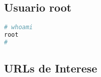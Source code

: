 \documentclass[a4paper]{article}
\begin{document}
\subsection{Usuario root}
        \begin{lstlisting}[language=Bash, caption=Usuario root]
# whoami
root
#\end{lstlisting}
        
\clearpage
\begin{appendices}
\makeatletter
{}

\vspace*{-0.7cm}
\section{URLs de Interese}
\vspace*{-0.2cm}
        \centering
        
\end{appendices}
\end{document}

